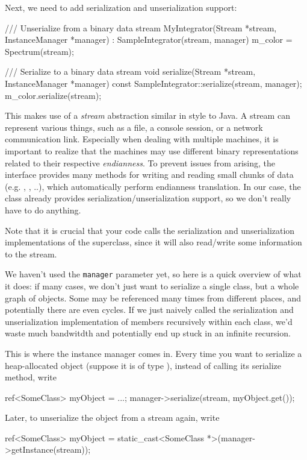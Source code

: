 Next, we need to add serialization and unserialization support:
\begin{cpp}
    /// Unserialize from a binary data stream
    MyIntegrator(Stream *stream, InstanceManager *manager)
     : SampleIntegrator(stream, manager) {
        m_color = Spectrum(stream);
    }

    /// Serialize to a binary data stream
    void serialize(Stream *stream, InstanceManager *manager) const {
        SampleIntegrator::serialize(stream, manager);
        m_color.serialize(stream);
    }
\end{cpp}
This makes use of a \emph{stream} abstraction similar in style to Java. 
A stream can represent various things, such as a file, a console session, or a 
network communication link. Especially when dealing with multiple machines,
it is important to realize that the machines may use different binary representations
related to their respective \emph{endianness}. To prevent issues from arising,
the  interface provides many methods for writing and reading 
small chunks of data (e.g. , , ..),
which automatically perform endianness translation. In our case, the
 class already provides serialization/unserialization support,
so we don't really have to do anything.

Note that it is crucial that your code calls the serialization and unserialization 
implementations of the superclass, since it will also read/write some
information to the stream.

We haven't used the \texttt{manager} parameter yet, so here is a quick overview
of what it does: if many cases, we don't just want to serialize a single class,
but a whole graph of objects. Some may be referenced many
times from different places, and potentially there are even cycles. If we just 
naively called the serialization and unserialization implementation of members 
recursively within each class, we'd waste much bandwitdth and potentially 
end up stuck in an infinite recursion.

This is where the instance manager comes in. Every time you want to serialize
a heap-allocated object (suppose it is of type ), 
instead of calling its serialize method, write

\begin{cpp}
ref<SomeClass> myObject = ...;
manager->serialize(stream, myObject.get());
\end{cpp}

Later, to unserialize the object from a stream again, write
\begin{cpp}
ref<SomeClass> myObject = static_cast<SomeClass *>(manager->getInstance(stream));
\end{cpp}

